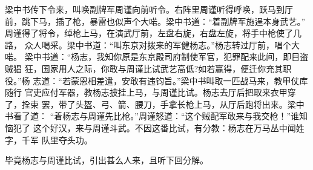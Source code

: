 梁中书传下令来，叫唤副牌军周谨向前听令。右阵里周谨听得呼唤，跃马到厅
前，跳下马，插了枪，暴雷也似声个大喏。梁中书道：“着副牌军施逞本身武艺。”
周谨得了将令，绰枪上马，在演武厅前，左盘右旋，右盘左旋，将手中枪使了几路，
众人喝采。梁中书道：“叫东京对拨来的军健杨志。”杨志转过厅前，唱个大喏。
梁中书道：“杨志，我知你原是东京殿司府制使军官，犯罪配来此间，即目盗贼猖
狂，国家用人之际，你敢与周谨比试武艺高低?如若赢得，便迁你充其职役。”杨
志道：“若蒙恩相差遣，安敢有违钧旨。”梁中书叫取一匹战马来，教甲仗库随行
官吏应付军器，教杨志披挂上马，与周谨比试。杨志去厅后把取来衣甲穿了，拴束
罢，带了头盔、弓、箭、腰刀，手拿长枪上马，从厅后跑将出来。梁中书看了道：
“着杨志与周谨先比枪。”周谨怒道：“这个贼配军敢来与我交枪！”谁知恼犯了
这个好汉，来与周谨斗武。不因这番比试，有分教：杨志在万马丛中闻姓字，千军
队里夺头功。

毕竟杨志与周谨比试，引出甚么人来，且听下回分解。